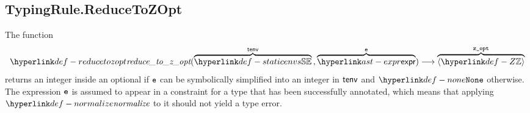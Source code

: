 \begin{mathpar}
\end{mathpar}

\begin{mathpar}
\end{mathpar}

\subsection{TypingRule.ReduceToZOpt \label{sec:TypingRule.ReduceToZOpt}}
\hypertarget{def-reducetozopt}{}
The function
\[
\reducetozopt(\overname{\staticenvs}{\tenv} \aslsep \overname{\expr}{\ve})
\aslto \overname{\langle\Z\rangle}{\vzopt}
\]
returns an integer inside an optional if $\ve$ can be symbolically simplified into an integer in $\tenv$
and $\None$ otherwise.
The expression $\ve$ is assumed to appear in a constraint for a type that has been successfully annotated,
which means that applying $\normalize$ to it should not yield a type error.

